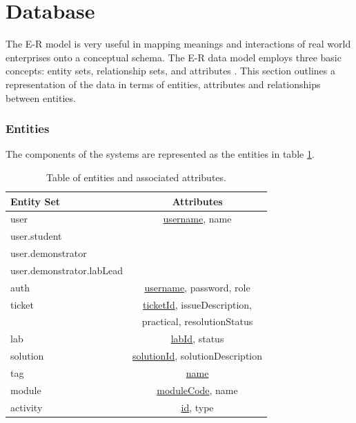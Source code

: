 \newpage
\section{Database}

The E-R model is very useful in mapping meanings and interactions of real world enterprises onto a conceptual schema. The E-R data model employs three basic concepts: entity sets, relationship sets, and attributes \cite{db}. This section outlines a representation of the data in terms of entities, attributes and relationships between entities.

\subsubsection{Entities}\label{sec:entities}

The components of the systems are represented as the entities in table \ref{tab:er}.

\FloatBarrier
\begin{table}[H]
\centering
\begin{tabular}{ |l|c| } 
 \hline
 \textbf{Entity Set} & \textbf{Attributes}\\ 
 \hline
  user & \underline{username}, name\\ 
 \hspace{6pt}user.student & \\ 
 \hspace{6pt}user.demonstrator & \\
 \hspace{12pt}user.demonstrator.labLead & \\
 \hline
 auth & \underline{username}, password, role \\
 \hline
 ticket & \underline{ticketId}, issueDescription,\\
 & practical, resolutionStatus \\
 \hline
 lab & \underline{labId}, status\\
 \hline
 solution & \underline{solutionId}, solutionDescription\\
 \hline
 tag & \underline{name} \\
 \hline
 module & \underline{moduleCode}, name \\
 \hline
 activity & \underline{id}, type \\
 \hline
\end{tabular}
\caption{Table of entities and associated attributes.}
\label{tab:er}
\end{table}
\FloatBarrier

